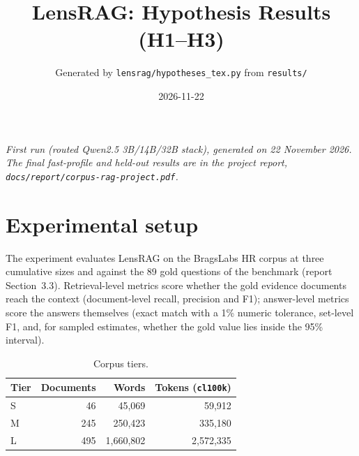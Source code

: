 \documentclass[11pt]{article}
\title{LensRAG: Hypothesis Results (H1--H3)}
\author{Generated by \texttt{lensrag/hypotheses\_tex.py} from \texttt{results/}}
\date{2026-11-22}
\begin{document}
\maketitle

\noindent\textit{First run (routed Qwen2.5 3B/14B/32B stack), generated on 22 November 2026. The final fast-profile and held-out results are in the project report, \texttt{docs/report/corpus-rag-project.pdf}.}

\section{Experimental setup}

The experiment evaluates LensRAG on the BragsLabs HR corpus at three cumulative sizes and against the 89 gold questions of the benchmark (report Section~3.3). Retrieval-level metrics score whether the gold evidence documents reach the context (document-level recall, precision and F1); answer-level metrics score the answers themselves (exact match with a 1\% numeric tolerance, set-level F1, and, for sampled estimates, whether the gold value lies inside the 95\% interval).

\begin{table}[htbp]
\centering\small
\caption{Corpus tiers.}
\label{tab:tiers}
\begin{tabular}{lrrr}
\toprule
Tier & Documents & Words & Tokens (\texttt{cl100k}) \\
\midrule
S & 46 & 45,069 & 59,912 \\
M & 245 & 250,423 & 335,180 \\
L & 495 & 1,660,802 & 2,572,335 \\
\bottomrule
\end{tabular}
\end{table}
\end{document}
